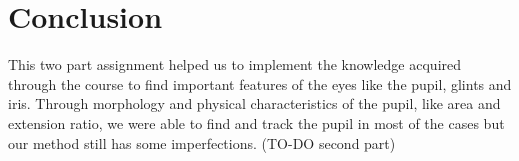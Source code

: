 \section{Conclusion}
This two part assignment helped us to implement the knowledge acquired through the course to find important features of the eyes like the pupil, glints and iris. Through morphology and physical characteristics of the pupil, like area and extension ratio, we were able to find and track the pupil in most of the cases but our method still has some imperfections. 
(TO-DO second part)
